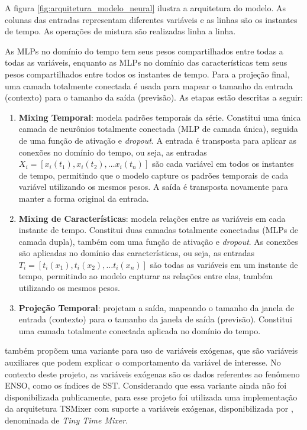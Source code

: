 A figura \ref{fig:arquitetura_modelo_neural} ilustra a arquitetura do modelo. As colunas das entradas representam diferentes
variáveis e as linhas são os instantes de tempo. As operações de mistura são realizadas linha a linha. 

As MLPs no domínio do tempo tem seus pesos compartilhados entre todas a todas as variáveis, enquanto as MLPs no domínio das 
características tem seus pesos compartilhados entre todos os instantes de tempo. Para a projeção final, uma camada totalmente 
conectada é usada para mapear o tamanho da entrada (contexto) para o tamanho da saída (previsão). As etapas estão descritas a seguir:

\begin{enumerate}
	\item \textbf{Mixing Temporal}: modela padrões temporais da série. Constitui uma única camada de neurônios totalmente
conectada (MLP de camada única), seguida de uma função de ativação e \textit{dropout}. A entrada é transposta para aplicar 
as conexões no domínio do tempo, ou seja, as entradas $ X_i = [x_i(t_1), x_i(t_2), \dots x_i(t_n)] $ são cada variável em todos 
os instantes de tempo, permitindo que o modelo capture os padrões temporais de cada variável utilizando os mesmos pesos.
A saída é transposta novamente para manter a forma original da entrada.

	\item \textbf{Mixing de Características}: modela relações entre as variáveis em cada instante de tempo. Constitui
duas camadas totalmente conectadas (MLPs de camada dupla), também com uma função de ativação e \textit{dropout}. As conexões
são aplicadas no domínio das características, ou seja, as entradas $ T_i = [t_i(x_1), t_i(x_2), \dots t_i(x_n)] $ são
todas as variáveis em um instante de tempo, permitindo ao modelo capturar as relações entre elas, também utilizando os
mesmos pesos.

	\item \textbf{Projeção Temporal}: projetam a saída, mapeando o tamanho da janela de entrada (contexto) para o tamanho 
da janela de saída (previsão). Constitui uma camada totalmente conectada aplicada no domínio do tempo.
\end{enumerate}

 também propõem uma variante para uso de variáveis exógenas, que são variáveis auxiliares que podem
explicar o comportamento da variável de interesse. No contexto deste projeto, as variáveis exógenas são os dados referentes
ao fenômeno ENSO, como os índices de SST. Considerando que essa variante ainda não foi disponibilizada publicamente,
para esse projeto foi utilizada uma implementação da arquitetura TSMixer com suporte a variáveis exógenas,
disponibilizada por , denominada de \textit{Tiny Time Mixer}.